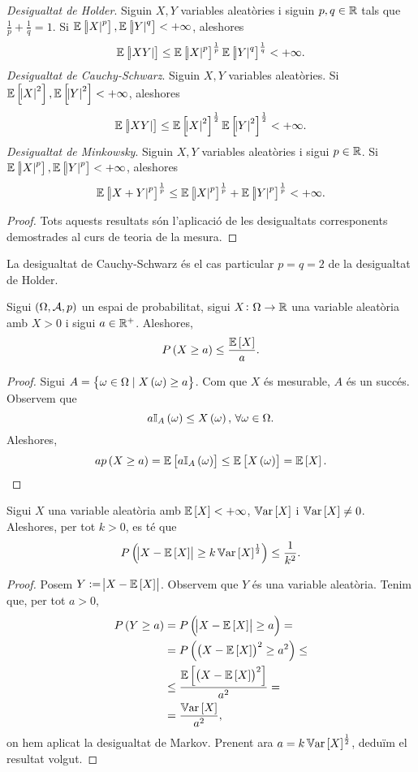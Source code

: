 \begin{prop}
    \textit{Desigualtat de Holder}. Siguin $X,Y$ variables aleatòries i siguin $p,q\in\mathbb{R}$ tals que $\frac{1}{p}+\frac{1}{q}=1$. Si $\operatorname{\mathbb{E}}\left[\abs{X}^p\right],\operatorname{\mathbb{E}}\left[\abs{Y}^q\right]<+\infty$, aleshores
    \[
        \operatorname{\mathbb{E}}\left[\abs{XY}\right]\leq\operatorname{\mathbb{E}}\left[\abs{X}^p\right]^{\frac{1}{p}}\operatorname{\mathbb{E}}\left[\abs{Y}^q\right]^{\frac{1}{q}}<+\infty.
    \]
    \textit{Desigualtat de Cauchy-Schwarz}. Siguin $X,Y$ variables aleatòries. Si $\operatorname{\mathbb{E}}\left[\abs{X}^2\right],\operatorname{\mathbb{E}}\left[\abs{Y}^2\right]<+\infty$, aleshores
    \[
        \operatorname{\mathbb{E}}\left[\abs{XY}\right]\leq\operatorname{\mathbb{E}}\left[\abs{X}^2\right]^{\frac{1}{2}}\operatorname{\mathbb{E}}\left[\abs{Y}^2\right]^{\frac{1}{2}}<+\infty.
    \]
    \textit{Desigualtat de Minkowsky}. Siguin $X,Y$ variables aleatòries i sigui $p\in\mathbb{R}$.
    Si $\operatorname{\mathbb{E}}\left[\abs{X}^p\right],\allowbreak \operatorname{\mathbb{E}}\left[\abs{Y}^p\right]<+\infty$, aleshores
    \[
        \operatorname{\mathbb{E}}\left[\abs{X+Y}^p\right]^{\frac{1}{p}}\leq\operatorname{\mathbb{E}}\left[\abs{X}^p\right]^{\frac{1}{p}}+\operatorname{\mathbb{E}}\left[\abs{Y}^p\right]^{\frac{1}{p}}<+\infty.
    \]
\end{prop}
\begin{proof}
    Tots aquests resultats són l'aplicació de les desigualtats corresponents demostrades al curs de teoria de la mesura.
\end{proof}
\begin{obs}
    La desigualtat de Cauchy-Schwarz és el cas particular $p=q=2$ de la desigualtat de Holder.
\end{obs}
\begin{teo}
    Sigui $\left(\Omega,\mathcal{A},p\right)$ un espai de probabilitat, sigui $X\colon\Omega\to\mathbb{R}$ una variable aleatòria amb $X>0$ i sigui $a\in\mathbb{R}^+$. Aleshores,
    \[
        P\left( X\geq a\right) \leq \frac{\operatorname{\mathbb{E}}\left[ X\right]}{a}.
    \]
\end{teo}
\begin{proof}
    Sigui $A=\left\{ \omega\in\Omega\mid X\left(\omega\right)\geq a\right\}$. Com que $X$ és mesurable, $A$ és un succés. Observem que
    \[
        a\mathbb{I}_A\left(\omega\right)\leq X\left(\omega\right),\,\forall\omega\in\Omega.
    \]
    Aleshores,
    \[
        ap\left( X\geq a\right) = \operatorname{\mathbb{E}}\left[ a\mathbb{I}_A\left(\omega\right)\right] \leq \operatorname{\mathbb{E}}\left[ X\left(\omega\right)\right] = \operatorname{\mathbb{E}}\left[ X\right].
    \]
\end{proof}
\begin{teo}
    Sigui $X$ una variable aleatòria amb $\operatorname{\mathbb{E}}\left[ X\right]<+\infty$, $\operatorname{\mathbb{V}ar}\left[ X\right]$ i $\operatorname{\mathbb{V}ar}\left[ X\right]\neq 0$. Aleshores, per tot $k>0$, es té que
    \[
        P\left( \abs{X-\operatorname{\mathbb{E}}\left[ X\right]}\geq k\operatorname{\mathbb{V}ar}\left[ X\right]^{\frac{1}{2}}\right)\leq\frac{1}{k^2}.
    \]
\end{teo}
\begin{proof}
    Posem $Y:=\abs{X-\operatorname{\mathbb{E}}\left[ X\right]}$. Observem que $Y$ és una variable aleatòria. Tenim que, per tot $a>0$,
    \begin{align*}
        P\left( Y\geq a\right) &= P\left(\abs{X-\operatorname{\mathbb{E}}\left[ X\right]}\geq a\right) = \\
        &= P\left(\left( X-\operatorname{\mathbb{E}}\left[ X\right]\right)^2\geq a^2\right) \leq\\
        &\leq \frac{\operatorname{\mathbb{E}}\left[ \left( X-\operatorname{\mathbb{E}}\left[ X\right]\right)^2\right]}{a^2} =\\
        &=\frac{\operatorname{\mathbb{V}ar}\left[ X\right]}{a^2},
    \end{align*}
    on hem aplicat la desigualtat de Markov. Prenent ara $a=k\operatorname{\mathbb{V}ar}\left[ X\right]^{\frac{1}{2}}$, deduïm el resultat volgut.
\end{proof}
